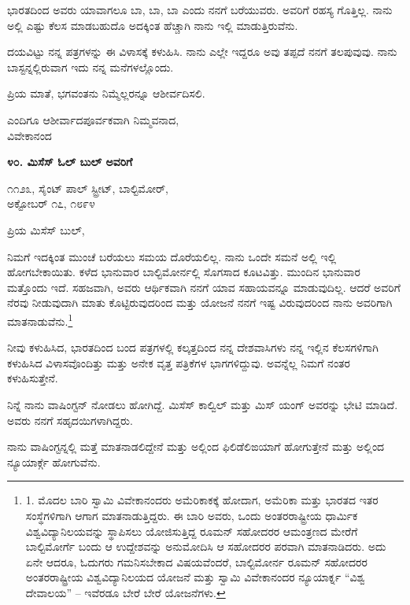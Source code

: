 ಭಾರತದಿಂದ ಅವರು ಯಾವಾಗಲೂ ಬಾ, ಬಾ, ಬಾ ಎಂದು ನನಗೆ ಬರೆಯುವರು. ಅವರಿಗೆ ರಹಸ್ಯ ಗೊತ್ತಿಲ್ಲ. ನಾನು ಅಲ್ಲಿ ಎಷ್ಟು ಕೆಲಸ ಮಾಡಬಹುದೊ ಅದಕ್ಕಿಂತ ಹೆಚ್ಚಾಗಿ ನಾನು ಇಲ್ಲಿ ಮಾಡುತ್ತಿರುವೆನು.

ದಯವಿಟ್ಟು ನನ್ನ ಪತ್ರಗಳನ್ನು ಈ ವಿಳಾಸಕ್ಕೆ ಕಳುಹಿಸಿ. ನಾನು ಎಲ್ಲೇ ಇದ್ದರೂ ಅವು ತಪ್ಪದೆ ನನಗೆ ತಲಪುವುವು. ನಾನು ಬಾಸ್ಟನ್ನಲ್ಲಿರುವಾಗ ಇದು ನನ್ನ ಮನೆಗಳಲ್ಲೊಂದು.

ಪ್ರಿಯ ಮಾತೆ, ಭಗವಂತನು ನಿಮ್ಮೆಲ್ಲರನ್ನೂ ಆಶೀರ್ವದಿಸಲಿ.

\begin{flushright}
ಎಂದಿಗೂ ಆಶೀರ್ವಾದಪೂರ್ವಕವಾಗಿ ನಿಮ್ಮವನಾದ,\\ವಿವೇಕಾನಂದ
\end{flushright}

\begin{center}
\textbf{೪೦. ಮಿಸೆಸ್ ಓಲ್ ಬುಲ್ ಅವರಿಗೆ}
\end{center}

\begin{flushright}
೧೧೨೩, ಸೈಂಟ್ ಪಾಲ್ ಸ್ಟ್ರೀಟ್, ಬಾಲ್ಟಿಮೋರ್,\\ಅಕ್ಟೋಬರ್ ೧೭, ೧೮೯೪
\end{flushright}

ಪ್ರಿಯ ಮಿಸೆಸ್ ಬುಲ್,

ನಿಮಗೆ ಇದಕ್ಕಿಂತ ಮುಂಚೆ ಬರೆಯಲು ಸಮಯ ದೊರೆಯಲಿಲ್ಲ. ನಾನು ಒಂದೇ ಸಮನೆ ಅಲ್ಲಿ ಇಲ್ಲಿ ಹೋಗಬೇಕಾಯಿತು. ಕಳೆದ ಭಾನುವಾರ ಬಾಲ್ಟಿಮೋರ್ನಲ್ಲಿ ಸೊಗಸಾದ ಕೂಟವಿತ್ತು. ಮುಂದಿನ ಭಾನುವಾರ ಮತ್ತೊಂದು ಇದೆ. ಸಹಜವಾಗಿ, ಅವರು ಆರ್ಥಿಕವಾಗಿ ನನಗೆ ಯಾವ ಸಹಾಯವನ್ನೂ ಮಾಡುವುದಿಲ್ಲ. ಆದರೆ ಅವರಿಗೆ ನೆರವು ನೀಡುವುದಾಗಿ ಮಾತು ಕೊಟ್ಟಿರುವುದರಿಂದ ಮತ್ತು ಯೋಜನೆ ನನಗೆ ಇಷ್ಟ ವಿರುವುದರಿಂದ ನಾನು ಅವರಿಗಾಗಿ ಮಾತನಾಡುವೆನು.\footnote{1. ಮೊದಲ ಬಾರಿ ಸ್ವಾಮಿ ವಿವೇಕಾನಂದರು ಅಮೆರಿಕಾಕಕ್ಕೆ ಹೋದಾಗ, ಅಮೆರಿಕಾ ಮತ್ತು ಭಾರತದ ಇತರ ಸಂಸ್ಥೆಗಳಿಗಾಗಿ ಆಗಾಗ ಮಾತನಾಡುತ್ತಿದ್ದರು. ಈ ಬಾರಿ ಅವರು, ಒಂದು ಅಂತರರಾಷ್ಟ್ರೀಯ ಧಾರ್ಮಿಕ ವಿಶ್ವವಿದ್ಯಾನಿಲಯವನ್ನು ಸ್ಥಾಪಿಸಲು ಯೋಜಿಸುತ್ತಿದ್ದ ರೂಮನ್ ಸಹೋದರರ ಆಮಂತ್ರಣದ ಮೇರೆಗೆ ಬಾಲ್ಟಿಮೋರ್ಗೆ ಬಂದು ಆ ಉದ್ದೇಶವನ್ನು ಅನುಮೋದಿಸಿ ಆ ಸಹೋದರರ ಪರವಾಗಿ ಮಾತನಾಡಿದರು. ಅದು ಏನೇ ಆದರೂ, ಓದುಗರು ಗಮನಿಸಬೇಕಾದ ವಿಷಯವೆಂದರೆ, ಬಾಲ್ಟಿಮೋರ್ನ ರೂಮನ್ ಸಹೋದರರ ಅಂತರರಾಷ್ಟ್ರೀಯ ವಿಶ್ವವಿದ್ಯಾನಿಲಯದ ಯೋಜನೆ ಮತ್ತು ಸ್ವಾಮಿ ವಿವೇಕಾನಂದರ ನ್ಯೂಯಾರ್ಕ್ನ “ವಿಶ್ವ ದೇವಾಲಯ” – ಇವೆರಡೂ ಬೇರೆ ಬೇರೆ ಯೋಜನೆಗಳು.}

ನೀವು ಕಳುಹಿಸಿದ, ಭಾರತದಿಂದ ಬಂದ ಪತ್ರಗಳಲ್ಲಿ ಕಲ್ಕತ್ತದಿಂದ ನನ್ನ ದೇಶವಾಸಿಗಳು ನನ್ನ ಇಲ್ಲಿನ ಕೆಲಸಗಳಿಗಾಗಿ ಕಳುಹಿಸಿದ ವಿಳಾಸವೊಂದಿತ್ತು ಮತ್ತು ಅನೇಕ ವೃತ್ತ ಪತ್ರಿಕೆಗಳ ಭಾಗಗಳಿದ್ದುವು. ಅವನ್ನೆಲ್ಲ ನಿಮಗೆ ನಂತರ ಕಳುಹಿಸುತ್ತೇನೆ.

ನಿನ್ನೆ ನಾನು ವಾಷಿಂಗ್ಟನ್ ನೋಡಲು ಹೋಗಿದ್ದೆ. ಮಿಸೆಸ್ ಕಾಲ್ವಿಲ್ ಮತ್ತು ಮಿಸ್ ಯಂಗ್ ಅವರನ್ನು ಭೇಟಿ ಮಾಡಿದೆ. ಅವರು ನನಗೆ ಸಹೃದಯಿಗಳಾಗಿದ್ದರು.

ನಾನು ವಾಷಿಂಗ್ಟನ್ನಲ್ಲಿ ಮತ್ತೆ ಮಾತನಾಡಲಿದ್ದೇನೆ ಮತ್ತು ಅಲ್ಲಿಂದ ಫಿಲಿಡೆಲಿಙಯಾಗೆ ಹೋಗುತ್ತೇನೆ ಮತ್ತು ಅಲ್ಲಿಂದ ನ್ಯೂಯಾರ್ಕ್ಗೆ ಹೋಗುವೆನು.

